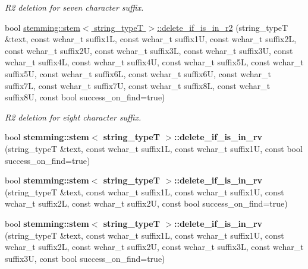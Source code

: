 \begin{DoxyCompactItemize}
\begin{DoxyCompactList}\small\item\em R2 deletion for seven character suffix. \end{DoxyCompactList}\item 
\hypertarget{group___stemming_ga9bbc2192839ce8ebcf88d0220cfa2441}{bool \hyperlink{group___stemming_ga9bbc2192839ce8ebcf88d0220cfa2441}{stemming\-::stem$<$ string\-\_\-type\-T $>$\-::delete\-\_\-if\-\_\-is\-\_\-in\-\_\-r2} (string\-\_\-type\-T \&text, const wchar\-\_\-t suffix1\-L, const wchar\-\_\-t suffix1\-U, const wchar\-\_\-t suffix2\-L, const wchar\-\_\-t suffix2\-U, const wchar\-\_\-t suffix3\-L, const wchar\-\_\-t suffix3\-U, const wchar\-\_\-t suffix4\-L, const wchar\-\_\-t suffix4\-U, const wchar\-\_\-t suffix5\-L, const wchar\-\_\-t suffix5\-U, const wchar\-\_\-t suffix6\-L, const wchar\-\_\-t suffix6\-U, const wchar\-\_\-t suffix7\-L, const wchar\-\_\-t suffix7\-U, const wchar\-\_\-t suffix8\-L, const wchar\-\_\-t suffix8\-U, const bool success\-\_\-on\-\_\-find=true)}\label{group___stemming_ga9bbc2192839ce8ebcf88d0220cfa2441}

\begin{DoxyCompactList}\small\item\em R2 deletion for eight character suffix. \end{DoxyCompactList}\item 
\hypertarget{group___stemming_ga3754d998db70ac20861ab3e87c3e5f25}{bool {\bfseries stemming\-::stem$<$ string\-\_\-type\-T $>$\-::delete\-\_\-if\-\_\-is\-\_\-in\-\_\-rv} (string\-\_\-type\-T \&text, const wchar\-\_\-t suffix1\-L, const wchar\-\_\-t suffix1\-U, const bool success\-\_\-on\-\_\-find=true)}\label{group___stemming_ga3754d998db70ac20861ab3e87c3e5f25}

\item 
\hypertarget{group___stemming_ga5d0a95806d9264f7238bf425311d1dfc}{bool {\bfseries stemming\-::stem$<$ string\-\_\-type\-T $>$\-::delete\-\_\-if\-\_\-is\-\_\-in\-\_\-rv} (string\-\_\-type\-T \&text, const wchar\-\_\-t suffix1\-L, const wchar\-\_\-t suffix1\-U, const wchar\-\_\-t suffix2\-L, const wchar\-\_\-t suffix2\-U, const bool success\-\_\-on\-\_\-find=true)}\label{group___stemming_ga5d0a95806d9264f7238bf425311d1dfc}

\item 
\hypertarget{group___stemming_ga70623a86bd9b759befe998a364d2bad2}{bool {\bfseries stemming\-::stem$<$ string\-\_\-type\-T $>$\-::delete\-\_\-if\-\_\-is\-\_\-in\-\_\-rv} (string\-\_\-type\-T \&text, const wchar\-\_\-t suffix1\-L, const wchar\-\_\-t suffix1\-U, const wchar\-\_\-t suffix2\-L, const wchar\-\_\-t suffix2\-U, const wchar\-\_\-t suffix3\-L, const wchar\-\_\-t suffix3\-U, const bool success\-\_\-on\-\_\-find=true)}\label{group___stemming_ga70623a86bd9b759befe998a364d2bad2}


\end{DoxyCompactItemize}
